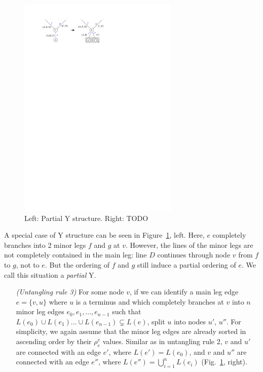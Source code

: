 \documentclass[format=acmsmall, review=false, screen=true]{acmart}
\begin{document}
\begin{figure}
  \centering
  \includegraphics[width=0.68\textwidth]{untangling/y_partial.pdf}
  \caption{Left: Partial Y structure. Right: TODO}  
  \label{FIG:untangle_y_partial}
\end{figure}


A special case of Y structure can be seen in Figure~\ref{FIG:untangle_y_partial}, left. Here, $e$ completely branches into 2 minor legs $f$ and $g$ at $v$. However, the lines of the minor legs are not completely contained in the main leg: line $D$ continues through node $v$ from $f$ to $g$, not to $e$. But the ordering of $f$ and $g$ still induce a partial ordering of $e$. We call this situation a \emph{partial} Y.

\begin{enumerate}[parsep=0.5mm, wide, labelwidth=0mm, itemindent=2.3mm]
  \setlength\itemsep{1pt}
  \item[\emph{(Untangling rule 3)}] For some node $v$, if we can identify a main leg edge $e = \{v, u\}$ where $u$ is a terminus and which completely branches at $v$ into $n$ minor leg edges $e_{0}, e_{1}, ..., e_{n-1}$ such that $L(e_{0}) \cup L(e_{1}) ... \cup L(e_{n-1}) \subsetneq L(e)$, split $u$ into nodes $u'$, $u''$. For simplicity, we again assume that the minor leg edges are already sorted in ascending order by their $\rho^v_e$ values. Similar as in untangling rule 2, $v$ and $u'$ are connected with an edge $e'$, where $L(e') = L(e_{0})$, and $v$ and $u''$ are connected with an edge $e''$, where $L(e'') = \bigcup^{n}_{i = 1} L(e_{i})$  (Fig.~\ref{FIG:untangle_y_partial}, right).
\end{enumerate}
\end{document}
